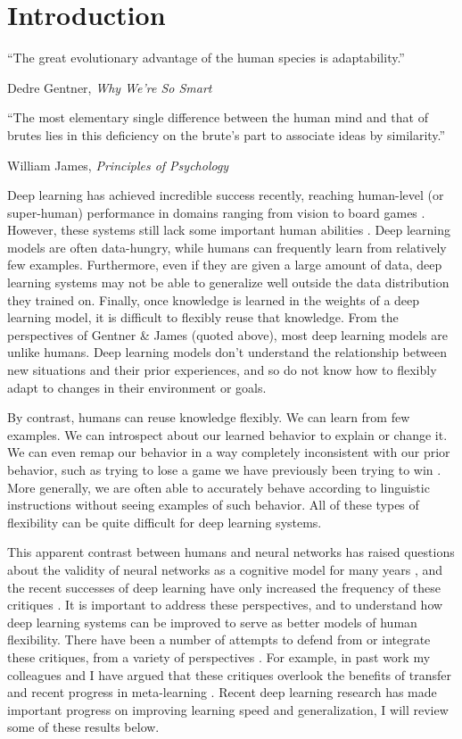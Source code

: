\chapter{Introduction} \label{chapter:introduction}
\epigraph{``The great evolutionary advantage of the human species is adaptability.''}{Dedre Gentner, \textit{Why We're So Smart}}
\epigraph{``The most elementary single difference between the human mind and that of brutes lies in this deficiency on the brute's part to associate ideas by similarity.''}{William James, \textit{Principles of Psychology}}
Deep learning has achieved incredible success recently, reaching human-level (or super-human) performance in domains ranging from vision \citep[e.g.][]{Szegedy2015} to board games \citep[e.g.][]{Silver2016}. However, these systems still lack some important human abilities \citep[e.g.][]{Lake2016}. Deep learning models are often data-hungry, while humans can frequently learn from relatively few examples. Furthermore, even if they are given a large amount of data, deep learning systems may not be able to generalize well outside the data distribution they trained on. Finally, once knowledge is learned in the weights of a deep learning model, it is difficult to flexibly reuse that knowledge. From the perspectives of Gentner \& James (quoted above), most deep learning models are unlike humans. Deep learning models don't understand the relationship between new situations and their prior experiences, and so do not know how to flexibly adapt to changes in their environment or goals. \par
By contrast, humans can reuse knowledge flexibly. We can learn from few examples. We can introspect about our learned behavior to explain or change it. We can even remap our behavior in a way completely inconsistent with our prior behavior, such as trying to lose a game we have previously been trying to win \citep{Lake2016}. More generally, we are often able to accurately behave according to linguistic instructions without seeing examples of such behavior. All of these types of flexibility can be quite difficult for deep learning systems. \par 
This apparent contrast between humans and neural networks has raised questions about the validity of neural networks as a cognitive model for many years \citep[e.g.][]{Fodor1988}, and the recent successes of deep learning have only increased the frequency of these critiques \citep[e.g.][]{Lake2015, Lake2016, Lake2017, Marcus2018}. It is important to address these perspectives, and to understand how deep learning systems can be improved to serve as better models of human flexibility. There have been a number of attempts to defend from or integrate these critiques, from a variety of perspectives \citep[e.g.][]{McClelland1999, McClelland2010, Hill2019a}. For example, in past work my colleagues and I have argued that these critiques overlook the benefits of transfer \citep{Lampinen2017a} and recent progress in meta-learning \citep{Hansen2017}. Recent deep learning research has made important progress on improving learning speed and generalization, I will review some of these results below. \par
